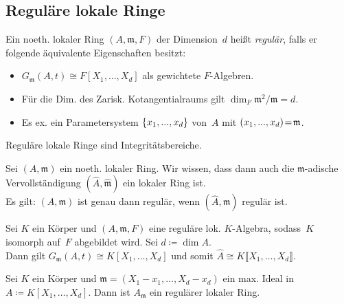 \documentclass{cheat-sheet}
\newcommand{\mmm}{\mathfrak{m}}
\begin{document}
\subsection{Reguläre lokale Ringe}


\begin{lemdefn}
  Ein noeth. lokaler Ring $(A, \mmm, F)$ der Dimension~$d$ heißt \emph{regulär}, falls er folgende äquivalente Eigenschaften besitzt:
  \begin{itemize}
    \item $G_\mmm(A, t) \cong F [X_1, \ldots, X_d]$ als gewichtete $F$-Algebren.
    \item Für die Dim. des Zarisk. Kotangentialraums gilt $\dim_F \mmm^2 / \mmm = d$.
    \item Es ex. ein Parametersystem $\{ x_1, ..., x_d \}$ von~$A$ mit $(x_1, \nldots, x_d) \!=\! \mmm$.
  \end{itemize}
\end{lemdefn}


\begin{lem}
  Reguläre lokale Ringe sind Integritätsbereiche.
\end{lem}


\begin{prop}
  Sei $(A, \mmm)$ ein noeth. lokaler Ring.
  Wir wissen, dass dann auch die $\mmm$-adische Vervollständigung $(\hat{A}, \hat{\mmm})$ ein lokaler Ring ist. \\
  Es gilt: \enspace
  $(A, \mmm)$ ist genau dann regulär, wenn $(\hat{A}, \hat{\mmm})$ regulär ist.
\end{prop}


\begin{bsp}
  Sei $K$ ein Körper und $(A, \mmm, F)$ eine reguläre lok. $K$-Algebra, sodass~$K$ isomorph auf~$F$ abgebildet wird.
  Sei $d \coloneqq \dim A$. \\
  Dann gilt $G_\mmm(A, t) \cong K [X_1, \ldots, X_d]$ und somit $\hat{A} \cong K \llbracket X_1, \ldots, X_d \rrbracket$.
\end{bsp}

\begin{bsp}
  Sei $K$ ein Körper und $\mmm = (X_1 - x_1, \ldots, X_d - x_d)$ ein max. Ideal in $A \coloneqq K [X_1, \ldots, X_d]$.
  Dann ist $A_\mmm$ ein regulärer lokaler Ring.
\end{bsp}
\end{document}
